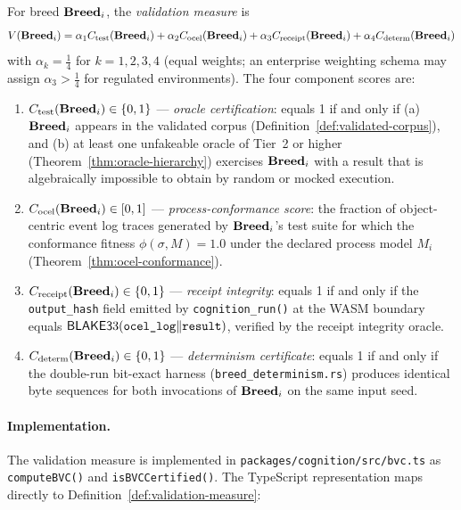 \begin{definition}
\label{def:validation-measure}
For breed $\mathbf{Breed}_i$, the \emph{validation measure} is
\[
  V(\mathbf{Breed}_i)
  = \alpha_1 C_{\mathrm{test}}(\mathbf{Breed}_i)
  + \alpha_2 C_{\mathrm{ocel}}(\mathbf{Breed}_i)
  + \alpha_3 C_{\mathrm{receipt}}(\mathbf{Breed}_i)
  + \alpha_4 C_{\mathrm{determ}}(\mathbf{Breed}_i)
\]
with $\alpha_k = \tfrac{1}{4}$ for $k = 1,2,3,4$ (equal weights; an enterprise weighting
schema may assign $\alpha_3 > \tfrac{1}{4}$ for regulated environments). The four
component scores are:

\begin{enumerate}
  \item $C_{\mathrm{test}}(\mathbf{Breed}_i) \in \{0,1\}$ — \emph{oracle certification}: equals
        1 if and only if (a) $\mathbf{Breed}_i$ appears in the validated corpus
        (Definition~\ref{def:validated-corpus}), and (b) at least one unfakeable oracle
        of Tier~2 or higher (Theorem~\ref{thm:oracle-hierarchy}) exercises $\mathbf{Breed}_i$
        with a result that is algebraically impossible to obtain by random or mocked
        execution.

  \item $C_{\mathrm{ocel}}(\mathbf{Breed}_i) \in [0,1]$ — \emph{process-conformance score}: the
        fraction of object-centric event log traces generated by $\mathbf{Breed}_i$'s test suite
        for which the conformance fitness $\phi(\sigma, M) = 1.0$ under the declared
        process model $M_i$ (Theorem~\ref{thm:ocel-conformance}).

  \item $C_{\mathrm{receipt}}(\mathbf{Breed}_i) \in \{0,1\}$ — \emph{receipt integrity}: equals
        1 if and only if the \texttt{output\_hash} field emitted by
        \texttt{cognition\_run()} at the WASM boundary equals
        $\mathsf{BLAKE3}3(\texttt{ocel\_log} \Vert \texttt{result})$, verified by the receipt
        integrity oracle.

  \item $C_{\mathrm{determ}}(\mathbf{Breed}_i) \in \{0,1\}$ — \emph{determinism certificate}:
        equals 1 if and only if the double-run bit-exact harness
        (\texttt{breed\_determinism.rs}) produces identical byte sequences for both
        invocations of $\mathbf{Breed}_i$ on the same input seed.
\end{enumerate}
\end{definition}

\paragraph{Implementation.}
The validation measure is implemented in
\texttt{packages/cognition/src/bvc.ts} as \texttt{computeBVC()} and
\texttt{isBVCCertified()}. The TypeScript representation maps directly to
Definition~\ref{def:validation-measure}:

